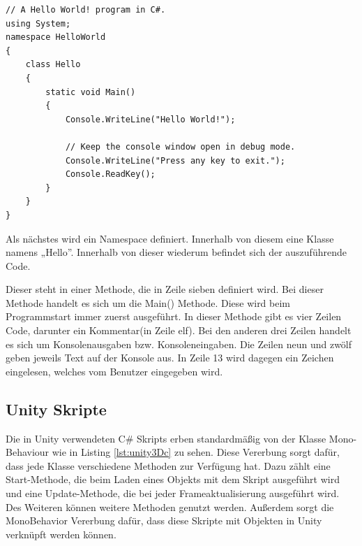 \begin{scriptsize}
\lstset{
	float,
	caption=Hello World in C\#, 
	language=[Sharp]C, 
	frame=single,  
	showstringspaces=false, 
	showspaces=false, 
	numbers=left, 
	captionpos=b, 
	belowcaptionskip=4pt,
	basicstyle=\ttfamily
} 

\begin{lstlisting}[label=lst:c_helloworld]
// A Hello World! program in C#.
using System;
namespace HelloWorld
{
    class Hello 
    {
        static void Main() 
        {
            Console.WriteLine("Hello World!");

            // Keep the console window open in debug mode.
            Console.WriteLine("Press any key to exit.");
            Console.ReadKey();
        }
    }
}
\end{lstlisting}
\end{scriptsize}

Als nächstes wird ein Namespace definiert. Innerhalb von diesem eine Klasse namens „Hello”. Innerhalb von dieser wiederum befindet sich der auszuführende Code.

Dieser steht in einer Methode, die in Zeile sieben definiert wird. Bei dieser Methode handelt es sich um die Main() Methode. Diese wird beim Programmstart immer zuerst ausgeführt. In dieser Methode gibt es vier Zeilen Code, darunter ein Kommentar(in Zeile elf). Bei den anderen drei Zeilen handelt es sich um Konsolenausgaben bzw. Konsoleneingaben. Die Zeilen neun und zwölf geben jeweils Text auf der Konsole aus. In Zeile 13 wird dagegen ein Zeichen eingelesen, welches vom Benutzer eingegeben wird.

\subsection{Unity Skripte}

Die in Unity verwendeten C\# Skripts erben standardmäßig von der Klasse Mono-Behaviour wie in Listing \ref{lst:unity3Dc} zu sehen. Diese Vererbung sorgt dafür, dass jede Klasse verschiedene Methoden zur Verfügung hat. Dazu zählt eine Start-Methode, die beim Laden eines Objekts mit dem Skript ausgeführt wird und eine Update-Methode, die bei jeder Frameaktualisierung ausgeführt wird. Des Weiteren können weitere Methoden genutzt werden. Außerdem sorgt die MonoBehavior Vererbung dafür, dass diese Skripte mit Objekten in Unity verknüpft werden können.

